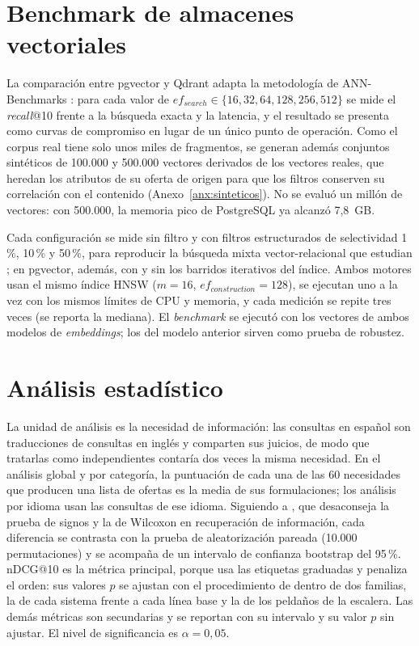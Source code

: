 \section{Benchmark de almacenes vectoriales}
\label{sec:met-benchmark}

La comparación entre pgvector y Qdrant adapta la metodología de ANN-Benchmarks \citep{Aumuller2020}: para cada valor de $ef_{search} \in \{16, 32, 64, 128, 256, 512\}$ se mide el \textit{recall}@10 frente a la búsqueda exacta y la latencia, y el resultado se presenta como curvas de compromiso en lugar de un único punto de operación. Como el corpus real tiene solo unos miles de fragmentos, se generan además conjuntos sintéticos de 100.000 y 500.000 vectores derivados de los vectores reales, que heredan los atributos de su oferta de origen para que los filtros conserven su correlación con el contenido (Anexo~\ref{anx:sinteticos}). No se evaluó un millón de vectores: con 500.000, la memoria pico de PostgreSQL ya alcanzó 7,8~GB.

Cada configuración se mide sin filtro y con filtros estructurados de selectividad 1\,\%, 10\,\% y 50\,\%, para reproducir la búsqueda mixta vector-relacional que estudian \citet{Sanca2024}; en pgvector, además, con y sin los barridos iterativos del índice. Ambos motores usan el mismo índice HNSW ($m=16$, $ef_{construction}=128$), se ejecutan uno a la vez con los mismos límites de CPU y memoria, y cada medición se repite tres veces (se reporta la mediana). El \textit{benchmark} se ejecutó con los vectores de ambos modelos de \textit{embeddings}; los del modelo anterior sirven como prueba de robustez.

\section{Análisis estadístico}
\label{sec:met-estadistica}

La unidad de análisis es la necesidad de información: las consultas en español son traducciones de consultas en inglés y comparten sus juicios, de modo que tratarlas como independientes contaría dos veces la misma necesidad. En el análisis global y por categoría, la puntuación de cada una de las 60 necesidades que producen una lista de ofertas es la media de sus formulaciones; los análisis por idioma usan las consultas de ese idioma. Siguiendo a \citet{Smucker2007}, que desaconseja la prueba de signos y la de Wilcoxon en recuperación de información, cada diferencia se contrasta con la prueba de aleatorización pareada (10.000 permutaciones) y se acompaña de un intervalo de confianza bootstrap del 95\,\%. nDCG@10 es la métrica principal, porque usa las etiquetas graduadas y penaliza el orden: sus valores $p$ se ajustan con el procedimiento de \citet{Holm1979} dentro de dos familias, la de cada sistema frente a cada línea base y la de los peldaños de la escalera. Las demás métricas son secundarias y se reportan con su intervalo y su valor $p$ sin ajustar. El nivel de significancia es $\alpha = 0{,}05$.

